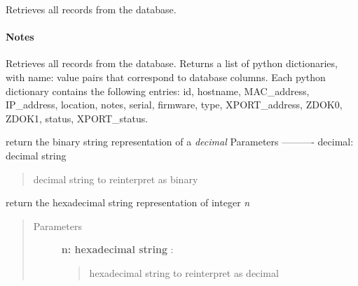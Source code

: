 \documentclass[letterpaper,10pt,english]{sphinxmanual}
\begin{document}

\begin{fulllineitems}
\label{index:roachnest_helpers.dbgetall}
Retrieves all records from the database.
\paragraph{Notes}

Retrieves all records from the database. Returns a list of python dictionaries, with
name: value pairs that correspond to database columns. Each python dictionary 
contains the following entries:
id, hostname, MAC\_address, IP\_address, location, notes, serial, firmware, type,
XPORT\_address, ZDOK0, ZDOK1, status, XPORT\_status.

\end{fulllineitems}



\begin{fulllineitems}
\label{index:roachnest_helpers.dec2bin}
return the binary string representation of a \emph{decimal}
Parameters
----------
decimal: decimal string
\begin{quote}

decimal string to reinterpret as binary
\end{quote}

\end{fulllineitems}



\begin{fulllineitems}
\label{index:roachnest_helpers.dec2hex}
return the hexadecimal string representation of integer \emph{n}
\begin{quote}\begin{description}
\item[{Parameters }] \leavevmode
\textbf{n: hexadecimal string} :
\begin{quote}

hexadecimal string to reinterpret as decimal
\end{quote}

\end{description}\end{quote}

\end{fulllineitems}
\end{document}
